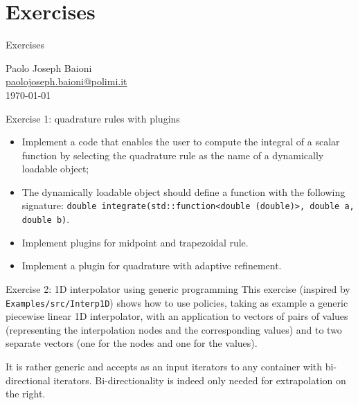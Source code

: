 \documentclass[10pt,aspectratio=169]{beamer}
\begin{document}
\section*{Exercises}

\begin{frame}
\centering
{ \huge Exercises}\\

\vspace{1cm}

\large Paolo Joseph Baioni \\ \href{mailto:paolojoseph.baioni@polimi.it}{\normalsize\color{blue}paolojoseph.baioni@polimi.it}\\

\vfill\today
\end{frame}

\begin{frame}{Exercise 1: quadrature rules with plugins}
\begin{itemize}
\item Implement a code that enables the user to compute the integral of a scalar function by selecting the quadrature rule as the name of a dynamically loadable object;
\item The dynamically loadable object should define a function with the following signature:
\texttt{double integrate(std::function<double (double)>, double a, double b)}.
\item Implement plugins for midpoint and trapezoidal rule.
\item {\color{gray}Implement a plugin for quadrature with adaptive refinement.}
\end{itemize}
\end{frame}

\begin{frame}{Exercise 2: 1D interpolator using generic programming}
This exercise (inspired by \texttt{Examples/src/Interp1D}) shows how to use policies, taking as example a generic piecewise linear 1D interpolator, with an application to
vectors of pairs of values (representing the interpolation nodes and the corresponding values) and to two separate vectors (one for the nodes and one for the values).

It is rather generic and accepts as an input iterators to any container with bi-directional iterators. Bi-directionality is indeed only needed for extrapolation on the right.
\end{frame}
\end{document}
